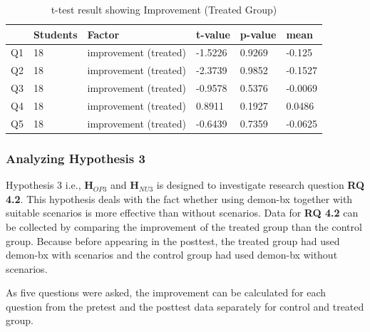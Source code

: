\begin{table}[ht]
	\centering	
	\begin{tabular}{|p{1cm}|p{1.5cm}|p{4.5cm}|p{1.5cm}|p{1.5cm}|p{1.5cm}|}
		\hline
		\rowcolor[gray]{.8}	
		\textbf{} & \textbf{Students} & \textbf{Factor} & \textbf{t-value} & \textbf{p-value} & \textbf{mean}\\
		\hline
		Q1 & 18 & improvement (treated) &  -1.5226 & 0.9269 & -0.125\\
		\hline
		Q2 & 18 & improvement (treated) & -2.3739 & 0.9852 & -0.1527\\
		\hline
		Q3 & 18 & improvement (treated) & -0.9578 & 0.5376 & -0.0069\\
		\hline	
		Q4 & 18 & improvement (treated) & 0.8911 & 0.1927 & 0.0486\\
		\hline
		Q5 & 18 & improvement (treated) & -0.6439 & 0.7359 & -0.0625\\
		\hline			
	\end{tabular}
	\caption{t-test result showing Improvement (Treated Group)}
	\label{tab:t-test_Imp-treated}
\end{table}

\subsubsection{Analyzing Hypothesis 3}\label{subsubsec:hypothesis3}
Hypothesis 3 i.e., \textbf{H$_{OP3}$} and \textbf{H$_{NU3}$} is designed to investigate research question \textbf{RQ 4.2}. This hypothesis deals with the fact whether using demon-bx together with suitable scenarios is more effective than without scenarios. Data for \textbf{RQ 4.2} can be collected by comparing the improvement of the treated group than the control group. Because before appearing in the posttest, the treated group had used demon-bx with scenarios and the control group had used demon-bx without scenarios.

As five questions were asked, the improvement can be calculated for each question from the pretest and the posttest data separately for control and treated group.  

